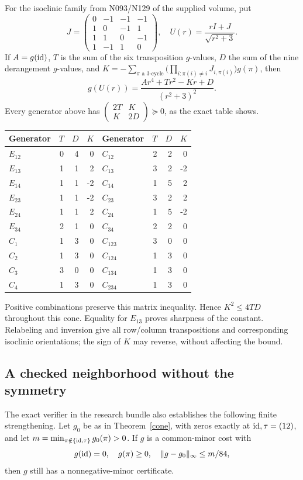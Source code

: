 \documentclass[11pt]{article}
\begin{document}
For the isoclinic family from N093/N129 of the supplied volume, put
\[
J=\begin{pmatrix}0&-1&-1&-1\\1&0&-1&1\\1&1&0&-1\\1&-1&1&0\end{pmatrix},
\quad U(r)=\frac{rI+J}{\sqrt{r^2+3}}.
\]
If $A=g(\mathrm{id})$, $T$ is the sum of the six transposition $g$-values, $D$ the sum of the nine derangement $g$-values, and
$K=-\sum_{\pi\text{ a 3-cycle}}\bigl(\prod_{i:\pi(i)\ne i}J_{i,\pi(i)}\bigr)g(\pi)$, then
\[
g(U(r))=\frac{Ar^4+Tr^2-Kr+D}{(r^2+3)^2}.
\]
Every generator above has $\left(\begin{smallmatrix}2T&K\\K&2D\end{smallmatrix}\right)\succeq0$, as the exact table shows.
\begin{center}\begin{tabular}{lrrr@{\qquad}lrrr}
\toprule Generator&$T$&$D$&$K$&Generator&$T$&$D$&$K$\\\midrule
$E_{12}$&0&4&0&$C_{12}$&2&2&0\\
$E_{13}$&1&1&2&$C_{13}$&3&2&-2\\
$E_{14}$&1&1&-2&$C_{14}$&1&5&2\\
$E_{23}$&1&1&-2&$C_{23}$&3&2&2\\
$E_{24}$&1&1&2&$C_{24}$&1&5&-2\\
$E_{34}$&2&1&0&$C_{34}$&2&2&0\\
$C_1$&1&3&0&$C_{123}$&3&0&0\\
$C_2$&1&3&0&$C_{124}$&1&3&0\\
$C_3$&3&0&0&$C_{134}$&1&3&0\\
$C_4$&1&3&0&$C_{234}$&1&3&0\\\bottomrule
\end{tabular}\end{center}
Positive combinations preserve this matrix inequality. Hence $K^2\le4TD$ throughout this cone. Equality for $E_{13}$ proves sharpness of the constant. Relabeling and inversion give all row/column transpositions and corresponding isoclinic orientations; the sign of $K$ may reverse, without affecting the bound.

\subsection{A checked neighborhood without the symmetry}
The exact verifier in the research bundle also establishes the following finite strengthening. Let $g_0$ be as in Theorem~\ref{cone}, with zeros exactly at $\mathrm{id},\tau=(12)$, and let
$m=\min_{\pi\notin\{\mathrm{id},\tau\}}g_0(\pi)>0$. If $g$ is a common-minor cost with
\[
g(\mathrm{id})=0,\quad g(\pi)\ge0,\quad \|g-g_0\|_\infty\le m/84,
\]
then $g$ still has a nonnegative-minor certificate.
\end{document}
